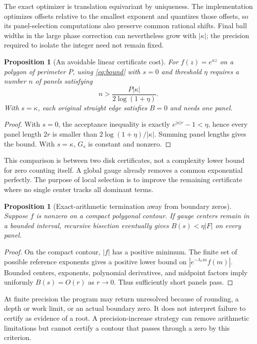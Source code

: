 \documentclass[11pt,a4paper]{article}
\newtheorem{proposition}[theorem]{Proposition}
\begin{document}
The exact optimizer is translation equivariant by uniqueness. The implementation optimizes offsets relative to the smallest exponent and quantizes those offsets, so its panel-selection computations also preserve common rational shifts. Final ball widths in the large phase correction can nevertheless grow with $|\kappa|$; the precision required to isolate the integer need not remain fixed.

\begin{proposition}[An avoidable linear certificate cost]\label{prop:cost}
For $f(z)=e^{\kappa z}$ on a polygon of perimeter $P$, using \eqref{eq:bound} with $s=0$ and threshold $\eta$ requires a number $n$ of panels satisfying
\begin{equation}
 n>\frac{P|\kappa|}{2\log(1+\eta)}.
\end{equation}
With $s=\kappa$, each original straight edge satisfies $B=0$ and needs one panel.
\end{proposition}
\begin{proof}
With $s=0$, the acceptance inequality is exactly $e^{|\kappa|r}-1<\eta$, hence every panel length $2r$ is smaller than $2\log(1+\eta)/|\kappa|$. Summing panel lengths gives the bound. With $s=\kappa$, $G_s$ is constant and nonzero.
\end{proof}

This comparison is between two disk certificates, not a complexity lower bound for zero counting itself. A global gauge already removes a common exponential perfectly. The purpose of local selection is to improve the remaining certificate where no single center tracks all dominant terms.

\begin{proposition}[Exact-arithmetic termination away from boundary zeros]\label{prop:terminate}
Suppose $f$ is nonzero on a compact polygonal contour. If gauge centers remain in a bounded interval, recursive bisection eventually gives $B(s)<\eta|F|$ on every panel.
\end{proposition}
\begin{proof}
On the compact contour, $|f|$ has a positive minimum. The finite set of possible reference exponents gives a positive lower bound on $|e^{-\lambda_*m}f(m)|$. Bounded centers, exponents, polynomial derivatives, and midpoint factors imply uniformly $B(s)=O(r)$ as $r\to0$. Thus sufficiently short panels pass.
\end{proof}
At finite precision the program may return unresolved because of rounding, a depth or work limit, or an actual boundary zero. It does not interpret failure to certify as evidence of a root. A precision-increase strategy can remove arithmetic limitations but cannot certify a contour that passes through a zero by this criterion.
\end{document}
